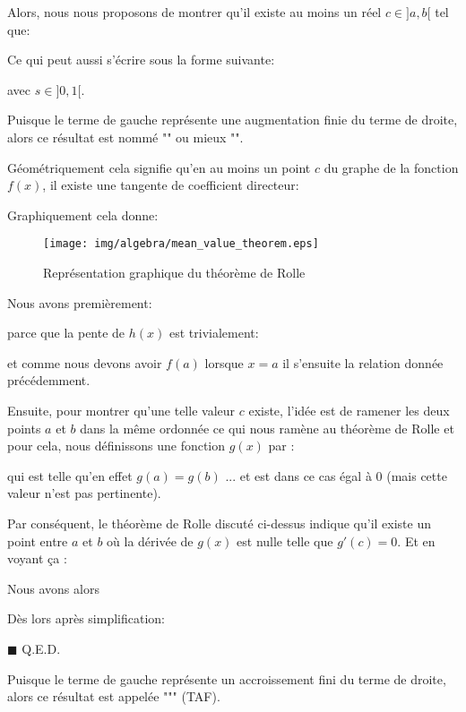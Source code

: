 	\begin{theorem}
	Alors, nous nous proposons de montrer qu'il existe au moins un réel $c \in ]a,b[ $ tel que:
	
	Ce qui peut aussi s'écrire sous la forme suivante:
	
	avec $s\in ]0,1[$.
	
	Puisque le terme de gauche représente une augmentation finie du terme de droite, alors ce résultat est nommé "" ou mieux "".
	
	Géométriquement cela signifie qu'en au moins un point $c$ du graphe de la fonction $f(x)$, il existe une tangente de coefficient directeur:
	
	Graphiquement cela donne:
	\begin{figure}[H]
	\centering
	\texttt{[image: img/algebra/mean\_value\_theorem.eps]}
	\caption{Représentation graphique du théorème de Rolle}
	\end{figure}
	
	\end{theorem}
	\begin{dem}
		Nous avons premièrement:
		
		parce que la pente de $h(x)$ est trivialement:
		
		et comme nous devons avoir $f(a)$ lorsque $x=a$ il s'ensuite la relation donnée précédemment.
		
		Ensuite, pour montrer qu'une telle valeur $c$ existe, l'idée est de ramener les deux points $a$ et $b$ dans la même ordonnée ce qui nous ramène au théorème de Rolle et pour cela, nous définissons une fonction $g (x)$ par :
		
		qui est telle qu'en effet $g(a)=g(b)$ ... et est dans ce cas égal à $0$ (mais cette valeur n'est pas pertinente).
	
		Par conséquent, le théorème de Rolle discuté ci-dessus indique qu'il existe un point entre $a$ et $b$ où la dérivée de $g(x)$ est nulle telle que $g'(c)=0$. Et en voyant ça :
		
		Nous avons alors
		
		Dès lors après simplification:
		
		\begin{flushright}
			$\blacksquare$  Q.E.D.
		\end{flushright}
	\end{dem}
	Puisque le terme de gauche représente un accroissement fini du terme de droite, alors ce résultat est appelée """ (TAF). 
	
